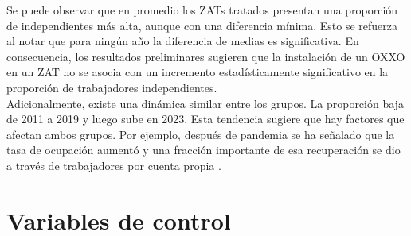 \documentclass{article}
\begin{document}
Se puede observar que en promedio los ZATs tratados presentan una proporción de independientes más alta, aunque con una diferencia mínima. Esto se refuerza al notar que para ningún año la diferencia de medias es significativa. En consecuencia, los resultados preliminares sugieren que la instalación de un OXXO en un ZAT no se asocia con un incremento estadísticamente significativo en la proporción de trabajadores independientes. \\


Adicionalmente, existe una dinámica similar entre los grupos. La proporción baja de 2011 a 2019 y luego sube en 2023. Esta tendencia sugiere que hay factores que afectan ambos grupos. Por ejemplo, después de pandemia se ha señalado que la tasa de ocupación aumentó y una fracción importante de esa recuperación se dio a través de trabajadores por cuenta propia \parencite{alvarez_informalidad_nodate,naranjo_ocupacion_2025,concejo_proyecto_2022,dane_emicron_2025}. \\


\section{Variables de control}
\end{document}
